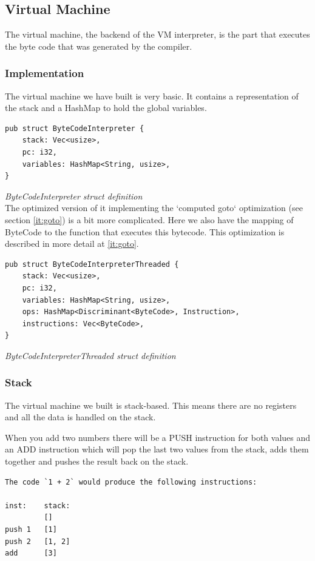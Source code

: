 \documentclass{article}
\begin{document}
\subsection{Virtual Machine}
The virtual machine, the backend of the VM interpreter, is the part that
executes the byte code that was generated by the compiler.

\subsubsection{Implementation}
The virtual machine we have built is very basic. It contains a representation
of the stack and a HashMap to hold the global variables.

\begin{verbatim}
pub struct ByteCodeInterpreter {
    stack: Vec<usize>,
    pc: i32,
    variables: HashMap<String, usize>,
}
\end{verbatim}
\textit{ByteCodeInterpreter struct definition} \\

The optimized version of it implementing the `computed goto` optimization (see
section \ref{it:goto}) is a bit more complicated. Here we also have the mapping
of ByteCode to the function that executes this bytecode. This optimization is 
described in more detail at \ref{it:goto}.

\begin{verbatim}
pub struct ByteCodeInterpreterThreaded {
    stack: Vec<usize>,
    pc: i32,
    variables: HashMap<String, usize>,
    ops: HashMap<Discriminant<ByteCode>, Instruction>,
    instructions: Vec<ByteCode>,
}
\end{verbatim}
\textit{ByteCodeInterpreterThreaded struct definition} \\

\subsubsection{Stack}
The virtual machine we built is stack-based. This means there are no registers
and all the data is handled on the stack.

When you add two numbers there will be a PUSH instruction for both values
and an ADD instruction which will pop the last two values from the stack,
adds them together and pushes the result back on the stack.

\begin{verbatim}
The code `1 + 2` would produce the following instructions:

inst:    stack:
         []
push 1   [1]
push 2   [1, 2]
add      [3]
\end{verbatim}
\end{document}
